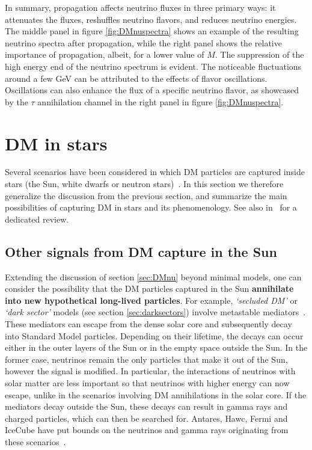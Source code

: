 In summary, 
propagation affects neutrino fluxes in three primary ways: it attenuates the fluxes, reshuffles neutrino flavors, and reduces neutrino energies. 
The  middle panel in figure \ref{fig:DMnuspectra} shows an example of the resulting neutrino spectra after propagation, 
while the right panel shows the relative importance of propagation, 
albeit, for a lower value of $M$.
The suppression of the high energy end of the neutrino spectrum is evident.
The noticeable fluctuations around a few GeV can be attributed to the effects of flavor oscillations.
Oscillations can also enhance the flux of a specific neutrino flavor,
as showcased by the $\tau$ annihilation channel in the right panel in figure \ref{fig:DMnuspectra}.



\section{DM in stars}\label{sec:DMinstars}
Several scenarios have been considered in which DM particles are captured inside stars (the Sun, white dwarfs or neutron stars)~\cite{DMinstarsReviews}. 
In this section we therefore generalize the discussion from the previous section, and summarize the main possibilities of capturing DM in stars and its phenomenology. See also  in~\cite{otherpastDMreviews} for a dedicated review.





\subsection{Other signals from DM capture in the Sun}\label{sec:DMnuother}
Extending the discussion of section \ref{sec:DMnu} beyond minimal models, one can consider the possibility that
the DM particles captured in the Sun {\bf annihilate into new hypothetical long-lived particles}.
For example, {\em `secluded DM'} or {\em `dark sector'} models (see section \ref{sec:darksectors}) involve metastable mediators~\cite{secludedDMandDMnu}.
These mediators can escape from the dense solar core and subsequently decay into Standard Model particles. Depending on their lifetime, the decays can occur either in the outer layers of the Sun or in the empty space outside the Sun. 
In the former case, neutrinos remain the only particles that make it out of 
the Sun, however the signal is modified. In particular, the 
 interactions of neutrinos with solar matter are less important 
 so that neutrinos with higher energy can now escape, 
unlike in the scenarios involving DM annihilations in the solar core.
If the mediators decay outside the Sun,
these decays can result in gamma rays and charged particles, which can  then be searched for. {\sc Antares}, {\sc Hawc}, {\sc Fermi} and {\sc IceCube} have put bounds on the neutrinos and gamma rays originating from these scenarios~\cite{secludedDMandDMnu,secludedDMsolarbounds}.

